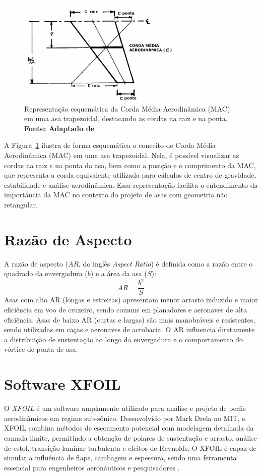 \begin{figure}[H]
    \centering
    \includegraphics[width=0.7\textwidth]{figures/mac_trapezio.jpg}
    \caption{Representação esquemática da Corda Média Aerodinâmica (MAC) em uma asa trapezoidal, destacando as cordas na raiz e na ponta. \textbf{Fonte: Adaptado de \cite{raymer2018aircraft}}}
    \label{fig:mac_exemplo}
\end{figure}

A Figura~\ref{fig:mac_exemplo} ilustra de forma esquemática o conceito de Corda Média Aerodinâmica (MAC) em uma asa trapezoidal. Nela, é possível visualizar as cordas na raiz e na ponta da asa, bem como a posição e o comprimento da MAC, que representa a corda equivalente utilizada para cálculos de centro de gravidade, estabilidade e análise aerodinâmica. Essa representação facilita o entendimento da importância da MAC no contexto do projeto de asas com geometria não retangular.

\section{Razão de Aspecto}
A razão de aspecto (\(AR\), do inglês \textit{Aspect Ratio}) é definida como a razão entre o quadrado da envergadura (\(b\)) e a área da asa (\(S\)):
\[
AR = \frac{b^2}{S}
\]
Asas com alto AR (longas e estreitas) apresentam menor arrasto induzido e maior eficiência em voo de cruzeiro, sendo comuns em planadores e aeronaves de alta eficiência. Asas de baixo AR (curtas e largas) são mais manobráveis e resistentes, sendo utilizadas em caças e aeronaves de acrobacia. O AR influencia diretamente a distribuição de sustentação ao longo da envergadura e o comportamento do vórtice de ponta de asa.

\section{Software XFOIL}
O \textit{XFOIL} é um software amplamente utilizado para análise e projeto de perfis aerodinâmicos em regime sub-sônico. Desenvolvido por Mark Drela no MIT, o XFOIL combina métodos de escoamento potencial com modelagem detalhada da camada limite, permitindo a obtenção de polares de sustentação e arrasto, análise de estol, transição laminar-turbulenta e efeitos de Reynolds. O XFOIL é capaz de simular a influência de flaps, cambagem e espessura, sendo uma ferramenta essencial para engenheiros aeronáuticos e pesquisadores \cite{drela1989xfoil}.


